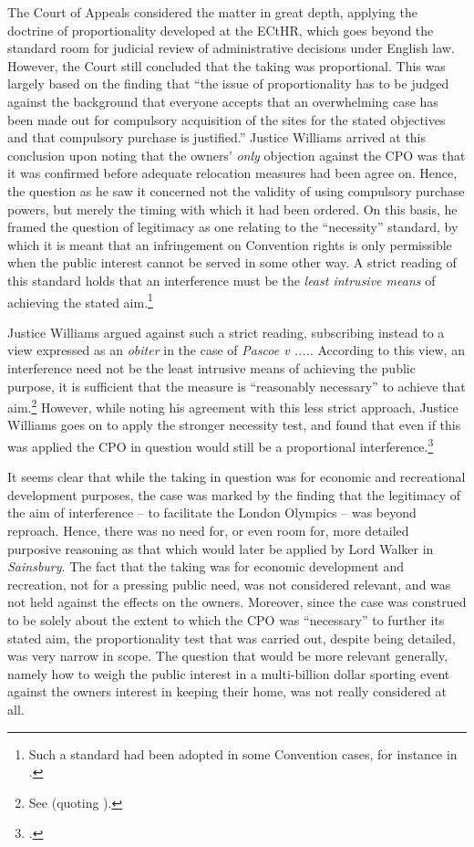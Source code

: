The Court of Appeals considered the matter in great depth, applying the doctrine of proportionality developed at the ECtHR, which goes beyond the standard room for judicial review of administrative decisions under English law. However, the Court still concluded that the taking was proportional. This was largely based on the finding that ``the issue of proportionality has to be judged against the background that everyone accepts that an overwhelming case has been made out for compulsory acquisition of the sites for the stated objectives and that compulsory purchase is justified.'' Justice Williams arrived at this conclusion upon noting that the owners' {\it only} objection against the CPO was that it was confirmed before adequate relocation measures had been agree on. Hence, the question as he saw it concerned not the validity of using compulsory purchase powers, but merely the timing with which it had been ordered. On this basis, he framed the question of legitimacy as one relating to the ``necessity'' standard, by which it is meant that an infringement on Convention rights is only permissible when the public interest cannot be served in some other way. A strict reading of this standard holds that an interference must be the {\it least intrusive means} of achieving the stated aim.\footnote{Such a standard had been adopted in some Convention cases, for instance in \cite{samaroo01}.}

Justice Williams argued against such a strict reading, subscribing instead to a view expressed as an {\it obiter} in the case of {\it Pascoe v ....}. According to this view, an interference need not be the least intrusive means of achieving the public purpose, it is sufficient that the measure is ``reasonably necessary'' to achieve that aim.\footnote{See \cite[74-75]{pascoe06} (quoting \cite[25]{clay04}).} However, while noting his agreement with this less strict approach, Justice Williams goes on to apply the stronger necessity test, and found that even if this was applied the CPO in question would still be a proportional interference.\footcite[41-50]{smith08}

It seems clear that while the taking in question was for economic and recreational development purposes, the case was marked by the finding that the legitimacy of the aim of interference -- to facilitate the London Olympics -- was beyond reproach. Hence, there was no need for, or even room for, more detailed purposive reasoning as that which would later be applied by Lord Walker in {\it Sainsbury}. The fact that the taking was for economic development and recreation, not for a pressing public need, was not considered relevant, and was not held against the effects on the owners. Moreover, since the case was construed to be solely about the extent to which the CPO was ``necessary'' to further its stated aim, the proportionality test that was carried out, despite being detailed, was very narrow in scope. The question that would be more relevant generally, namely how to weigh the public interest in a multi-billion dollar sporting event against the owners interest in keeping their home, was not really considered at all.

